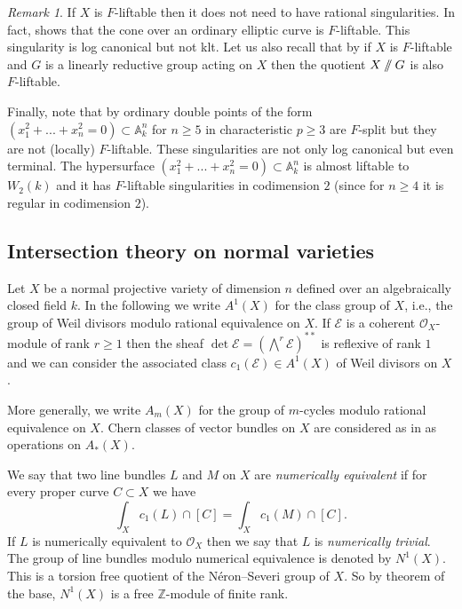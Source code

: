 \documentclass[12pt]{article}
\theoremstyle{plain}
\theoremstyle{definition}
\theoremstyle{remark}
\newtheorem{Remark}[Thm]{Remark}
\renewcommand{\AA}{{\mathbb A}}
\newcommand{\ZZ}{{\mathbb Z}}
\newcommand{\cE}{{\mathcal E}}
\newcommand{\cO}{{\mathcal O}}
\newcommand{\sslash}{\mathbin{
		\mathchoice{/\mkern-6mu/}%
		{/\mkern-6mu/}%
		{/\mkern-5mu/}%
		{/\mkern-5mu/}}}%
\begin{document}
\begin{Remark}
If $X$ is $F$-liftable then it does not need to have rational singularities.
In fact, \cite[Example 5.2]{Zd} shows that the cone over an ordinary elliptic curve is $F$-liftable. This singularity is log canonical but not klt. Let us also recall that by \cite[Theorem 2.10, (c)]{AWZ2} if $X$ is $F$-liftable and $G$ is a linearly reductive group acting on $X$ then the quotient $X\sslash G$ is also $F$-liftable.

Finally, note that by \cite[Theorem 4.15]{Zd} ordinary double points of the form $(x_1^2+...+x_n^2=0)\subset \AA^n_k$ for $n\ge 5$ in characteristic $p\ge 3$  are $F$-split but they are not (locally) $F$-liftable.
 These singularities  are not only log canonical but even  terminal.  The hypersurface $(x_1^2+...+x_n^2=0)\subset \AA^n_k$ is almost liftable to $W_2(k)$  and it has $F$-liftable singularities in codimension $2$ (since for $n\ge 4$ it is regular in codimension $2$).
\end{Remark}





\subsection{Intersection theory on normal varieties}\label{Subsection:intersection-theory}

Let $X$ be a normal projective variety of dimension $n$ defined  over an algebraically closed field $k$.
In the following we write $A^1(X)$ for the class group of $X$, i.e., the group of Weil divisors modulo 
rational equivalence on $X$. If $\cE$ is a coherent $\cO_X$-module of rank $r\ge 1$ then the sheaf $\det \cE =(\bigwedge ^r \cE)^{**}$ is  reflexive of rank $1$ and we can consider the associated class $c_1 (\cE)\in A^1(X)$ of Weil divisors on $X$. 

More generally, we write $A_m (X)$ for the group of $m$-cycles modulo rational equivalence on $X$. Chern classes of vector bundles on $X$ are considered as in \cite{Fu} as operations on $A_*(X)$.

We say that two line bundles $L$ and $M$ on $X$ are \emph{numerically equivalent}
if for every proper curve $ C\subset X$ we have
$$\int_Xc_1(L)\cap [C]= \int_Xc_1(M)\cap [C].$$
If $L$ is numerically equivalent to $\cO_X$ then we say that $L$ is \emph{numerically trivial}. The group of line bundles modulo numerical equivalence is denoted by 
$N^1(X)$. This is a torsion free quotient of the N\'eron--Severi group of $X$. So by theorem of the base, $N^1(X)$ is a free $\ZZ$-module of finite rank. 
\end{document}
